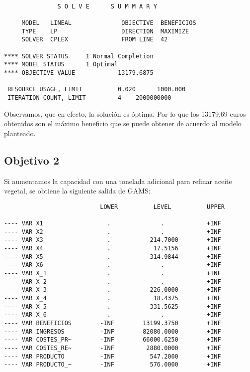\documentclass[12pt,a4paper,twoside,openright,titlepage,final]{article}
\begin{document}
\begin{verbatim}

               S O L V E      S U M M A R Y

     MODEL   LINEAL              OBJECTIVE  BENEFICIOS
     TYPE    LP                  DIRECTION  MAXIMIZE
     SOLVER  CPLEX               FROM LINE  42

**** SOLVER STATUS     1 Normal Completion         
**** MODEL STATUS      1 Optimal                   
**** OBJECTIVE VALUE            13179.6875

 RESOURCE USAGE, LIMIT          0.020      1000.000
 ITERATION COUNT, LIMIT         4    2000000000

\end{verbatim}

Observamos, que en efecto, la solución es óptima. Por lo que los 13179.69 euros obtenidos son el máximo beneficio que se puede obtener de acuerdo al modelo planteado.

\subsection{Objetivo 2}

Si aumentamos la capacidad con una tonelada adicional para refinar aceite vegetal, se obtiene la siguiente salida de GAMS:

\begin{verbatim}
                           LOWER          LEVEL          UPPER      

---- VAR X1                  .              .            +INF     
---- VAR X2                  .              .            +INF     
---- VAR X3                  .           214.7000        +INF      
---- VAR X4                  .            17.5156        +INF       
---- VAR X5                  .           314.9844        +INF       
---- VAR X6                  .              .            +INF          
---- VAR X_1                 .              .            +INF      
---- VAR X_2                 .              .            +INF          
---- VAR X_3                 .           226.0000        +INF           
---- VAR X_4                 .            18.4375        +INF         
---- VAR X_5                 .           331.5625        +INF         
---- VAR X_6                 .              .            +INF    
---- VAR BENEFICIOS        -INF        13199.3750        +INF            
---- VAR INGRESOS          -INF        82080.0000        +INF               
---- VAR COSTES_PR~        -INF        66000.6250        +INF               
---- VAR COSTES_RE~        -INF         2880.0000        +INF               
---- VAR PRODUCTO          -INF          547.2000        +INF              
---- VAR PRODUCTO_~        -INF          576.0000        +INF                 
\end{verbatim}
\end{document}
